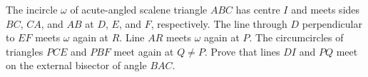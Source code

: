 The incircle $\omega$ of acute-angled scalene triangle $ABC$ has centre $I$ and meets sides $BC$, $CA$, and $AB$ at $D$, $E$, and $F$, respectively. The line through $D$ perpendicular to $EF$ meets $\omega$ again at $R$. Line $AR$ meets $\omega$ again at $P$. The circumcircles of triangles $PCE$ and $PBF$ meet again at $Q \neq P$. Prove that lines $DI$ and $PQ$ meet on the external bisector of angle $BAC$.

